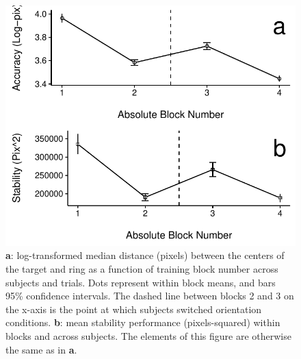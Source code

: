 \begin{figure}[htbp]
\centering
\includegraphics[width=.75\linewidth,height=.75\textheight,keepaspectratio]{figures/chapter_2/outcome_by_block.pdf}
\caption[Experiment 2: Outcomes by Block]{\textbf{a}: log-transformed median distance (pixels) between the centers of the target and ring as a function of training block number across subjects and trials. Dots represent within block means, and bars 95\% confidence intervals. The dashed line between blocks 2 and 3 on the x-axis is the point at which subjects switched orientation conditions. \textbf{b}: mean stability performance (pixels-squared) within blocks and across subjects. The elements of this figure are otherwise the same as in \textbf{a}.}\label{chap_2_outcome_by_block}
\end{figure}

